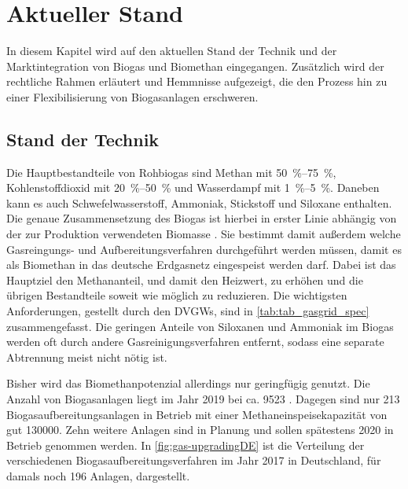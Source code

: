 \section{Aktueller Stand}

In diesem Kapitel wird auf den aktuellen Stand der Technik und der Marktintegration von Biogas und Biomethan eingegangen. Zusätzlich wird der rechtliche Rahmen erläutert und Hemmnisse aufgezeigt, die den Prozess hin zu einer Flexibilisierung von Biogasanlagen erschweren.


\subsection{Stand der Technik}\label{chap:stateofart}

Die Hauptbestandteile von Rohbiogas sind Methan mit \SIrange{50}{75}{\percent}, Kohlenstoffdioxid mit \SIrange{20}{50}{\percent} und Wasserdampf mit \SIrange{1}{5}{\percent}. Daneben kann es auch Schwefelwasserstoff, Ammoniak, Stickstoff und Siloxane enthalten. Die genaue Zusammensetzung des Biogas ist hierbei in erster Linie abhängig von der zur Produktion verwendeten Biomasse \parencite{Rasi09}. Sie bestimmt damit außerdem welche Gasreingungs- und Aufbereitungsverfahren durchgeführt werden müssen, damit es als Biomethan in das deutsche Erdgasnetz eingespeist werden darf. Dabei ist das Hauptziel den Methananteil, und damit den Heizwert, zu erhöhen und die übrigen Bestandteile soweit wie möglich zu reduzieren. Die wichtigsten Anforderungen, gestellt durch den \glspl{DVGW}, sind in \ref{tab:tab_gasgrid_spec} zusammengefasst. Die geringen Anteile von Siloxanen und Ammoniak im Biogas werden oft durch andere Gasreinigungsverfahren entfernt, sodass eine separate Abtrennung meist nicht nötig ist. \parencite{FNR14}\parencite{KoBi16}




Bisher wird das Biomethanpotenzial allerdings nur geringfügig genutzt. Die Anzahl von Biogasanlagen liegt im Jahr \SI{2019}{\relax} bei ca. \SI{9523}{\relax} \parencite{FaBio19}. Dagegen sind nur \SI{213}{\relax} Biogasaufbereitungsanlagen in Betrieb mit einer Methaneinspeisekapazität von gut \SI{130000}{\normvolh}. Zehn weitere Anlagen sind in Planung und sollen spätestens \SI{2020}{\relax} in Betrieb genommen werden. In \ref{fig:gas-upgradingDE} ist die Verteilung der verschiedenen Biogasaufbereitungsverfahren im Jahr \SI{2017}{\relax} in Deutschland, für damals noch \SI{196}{\relax} Anlagen, dargestellt. \parencite{dena19}

